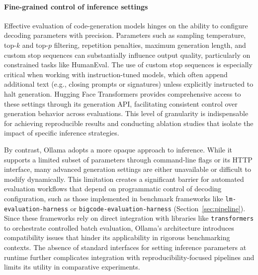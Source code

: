 \paragraph{Fine-grained control of inference settings}
Effective evaluation of code-generation models hinges on the ability to configure decoding parameters with precision. Parameters such as sampling temperature, top-$k$ and top-$p$ filtering, repetition penalties, maximum generation length, and custom stop sequences can substantially influence output quality, particularly on constrained tasks like HumanEval. The use of custom stop sequences is especially critical when working with instruction-tuned models, which often append additional text (e.g., closing prompts or signatures) unless explicitly instructed to halt generation. Hugging Face Transformers provides comprehensive access to these settings through its generation API, facilitating consistent control over generation behavior across evaluations. This level of granularity is indispensable for achieving reproducible results and conducting ablation studies that isolate the impact of specific inference strategies.

By contrast, Ollama adopts a more opaque approach to inference. While it supports a limited subset of parameters through command-line flags or its HTTP interface, many advanced generation settings are either unavailable or difficult to modify dynamically. This limitation creates a significant barrier for automated evaluation workflows that depend on programmatic control of decoding configuration, such as those implemented in benchmark frameworks like \texttt{lm-evaluation-harness} or \texttt{bigcode-evaluation-harness} (Section~\ref{sec:pipeline}). Since these frameworks rely on direct integration with libraries like \texttt{transformers} to orchestrate controlled batch evaluation, Ollama’s architecture introduces compatibility issues that hinder its applicability in rigorous benchmarking contexts. The absence of standard interfaces for setting inference parameters at runtime further complicates integration with reproducibility-focused pipelines and limits its utility in comparative experiments.

